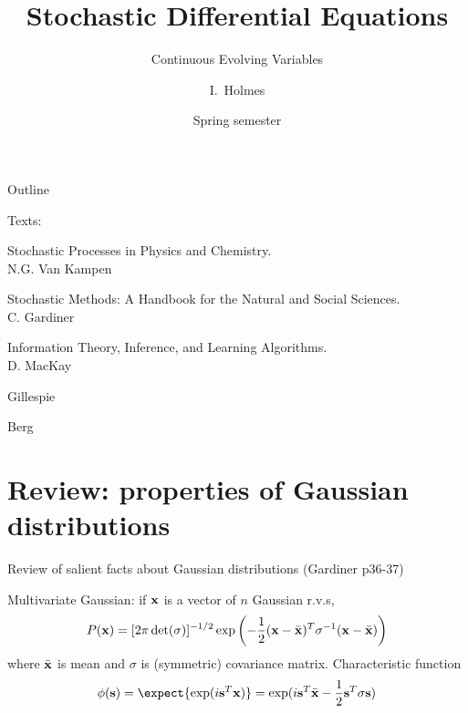 \documentclass{beamer}
\title[SDEs] %
{Stochastic Differential Equations}
\subtitle
{Continuous Evolving Variables} %
\author%
{I.~Holmes} %
\institute[University of California, Berkeley] %
{
  Department of Bioengineering\\
  University of California, Berkeley}
\date%
{Spring semester}
\begin{document}
\begin{frame}
  \titlepage
\end{frame}

\begin{frame}{Outline}
  \tableofcontents
\end{frame}



\begin{frame}{}

  Texts:
  \itemb
\item Stochastic Processes in Physics and Chemistry. \\ N.G. Van Kampen
\item Stochastic Methods: A Handbook for the Natural and Social Sciences. \\ C. Gardiner
\item Information Theory, Inference, and Learning Algorithms. \\ D. MacKay
\item Gillespie
\item Berg
  \iteme
  
\end{frame}


\section{Review: properties of Gaussian distributions}

\begin{frame}{}


  Review of salient facts about Gaussian distributions (Gardiner p36-37)
  
   Multivariate Gaussian: if ${\bf x}$ is a vector of $n$ Gaussian r.v.s,
\[
P({\bf x}) = [ 2\pi \det(\sigma) ]^{-1/2} \exp \left( -\frac{1}{2}({\bf x} - \bar{\bf x})^T \sigma^{-1} ({\bf x} - \bar{\bf x}) \right)
\]
where $\bar{\bf x}$ is mean and $\sigma$ is (symmetric) covariance matrix.
   Characteristic function
\[
\phi({\bf s}) = \expect{\exp(i {\bf s}^T {\bf x})} = \exp(i {\bf s}^T \bar{\bf x} - \frac{1}{2} {\bf s}^T \sigma {\bf s})
\]




\end{frame}
\end{document}
